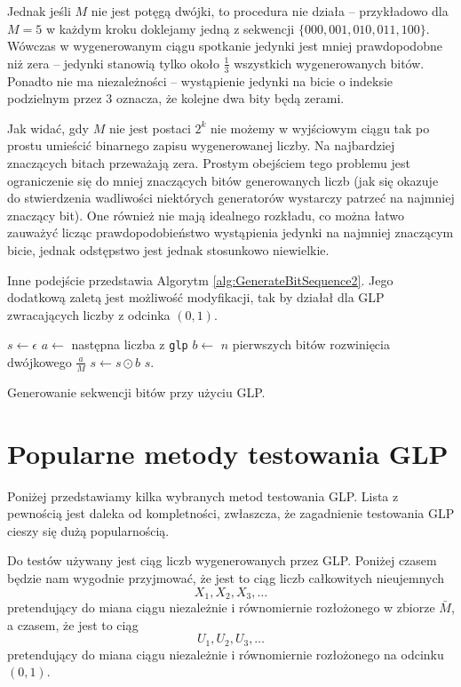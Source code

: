 \documentclass[a4paper,11pt,twoside]{book}
\theoremstyle{definition}
\begin{document}
Jednak jeśli $M$ nie jest potęgą dwójki, to procedura nie działa -- przykładowo dla $M=5$ w każdym kroku doklejamy jedną z sekwencji $\{000, 001, 010, 011, 100\}$. Wówczas w wygenerowanym ciągu spotkanie jedynki jest mniej prawdopodobne niż zera -- jedynki stanowią tylko około $\frac{1}{3}$ wszystkich wygenerowanych bitów. Ponadto nie ma niezależności -- wystąpienie jedynki na bicie o indeksie podzielnym przez 3 oznacza, że kolejne dwa bity będą zerami.

Jak widać, gdy $M$ nie jest postaci $2^k$ nie możemy w wyjściowym ciągu tak po prostu umieścić binarnego zapisu wygenerowanej liczby. Na najbardziej znaczących bitach przeważają zera. Prostym obejściem tego problemu jest ograniczenie się do mniej znaczących bitów generowanych liczb (jak się okazuje do stwierdzenia wadliwości niektórych generatorów wystarczy patrzeć na najmniej znaczący bit). One również nie mają idealnego rozkładu, co można łatwo zauważyć licząc prawdopodobieństwo wystąpienia jedynki na najmniej znaczącym bicie, jednak odstępstwo jest jednak stosunkowo niewielkie.

Inne podejście przedstawia Algorytm \ref{alg:GenerateBitSequence2}. Jego dodatkową zaletą jest możliwość modyfikacji, tak by działał dla GLP zwracających liczby z odcinka $(0,1)$.
\begin{algorithm}
 \begin{algorithmic}[1]
    \State $s \gets \epsilon$
      \State $a \gets$ następna liczba z \texttt{glp}
      \State $b \gets$ $n$ pierwszych bitów rozwinięcia dwójkowego $\frac{a}{M}$
      \State $s \gets s \odot b$
     \EndWhile
    \State \Return $s$.
  \EndFunction
 \end{algorithmic}
 \caption{Generowanie sekwencji bitów przy użyciu GLP.}
 \label{alg:GenerateBitSequence2}
\end{algorithm}

\section{Popularne metody testowania GLP}
Poniżej przedstawiamy kilka wybranych metod testowania GLP. Lista z pewnością jest daleka od kompletności, zwłaszcza, że zagadnienie testowania GLP cieszy się dużą popularnością.

Do testów używany jest ciąg liczb wygenerowanych przez GLP. Poniżej czasem będzie nam wygodnie przyjmować, że jest to ciąg liczb całkowitych nieujemnych
\[ X_1, X_2, X_3, \ldots \]
pretendujący do miana ciągu niezależnie i równomiernie rozłożonego w zbiorze $\bar{M}$, a czasem, że jest to ciąg
\[ U_1, U_2, U_3, \ldots \]
pretendujący do miana ciągu niezależnie i równomiernie rozłożonego na odcinku $(0,1)$.
\end{document}
